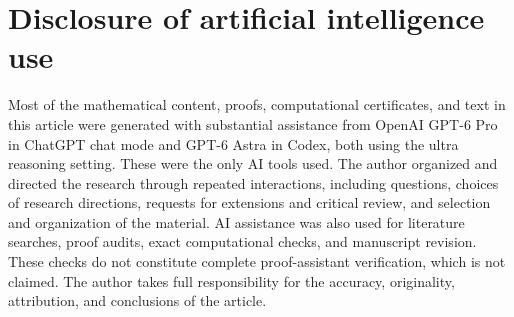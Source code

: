 \documentclass[reqno]{amsart}
\theoremstyle{definition}
\theoremstyle{remark}
\begin{document}
\section*{Disclosure of artificial intelligence use}
Most of the mathematical content, proofs, computational certificates,
and text in this article were generated with substantial assistance from
OpenAI GPT-6 Pro in ChatGPT chat mode and GPT-6 Astra in Codex, both
using the ultra reasoning setting. These were the only AI tools used.
The author organized and directed the research through repeated
interactions, including questions, choices of research directions,
requests for extensions and critical review, and selection and
organization of the material. AI assistance was also used for
literature searches, proof audits, exact computational checks, and
manuscript revision. These checks do not constitute complete
proof-assistant verification, which is not claimed.
The author takes full responsibility for the accuracy, originality,
attribution, and conclusions of the article.

\providecommand{\bysame}{\leavevmode\hbox to3em{\hrulefill}\thinspace}
\providecommand{\MR}{\relax\ifhmode\unskip\space\fi MR }
\providecommand{\MRhref}[2]{%
  \href{http://www.ams.org/mathscinet-getitem?mr=#1}{#2}
}
\providecommand{\href}[2]{#2}
\end{document}
